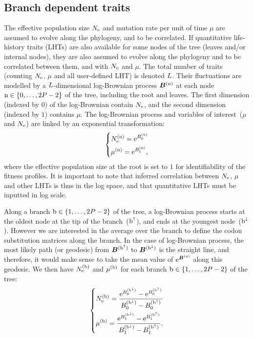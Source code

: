 \documentclass{MBE}
\begin{document}
	\subsection{Branch dependent traits}
	The {effective population size} $N_{\text{e}}$ and mutation rate per unit of time $\mu$ are assumed to evolve along the phylogeny, and to be correlated.
	If quantitative life-history traits ({LHT}s) are also available for some nodes of the tree (leaves and/or internal nodes), they are also assumed to evolve along the phylogeny and to be correlated between them, and with $N_{\text{e}}$ and $\mu$.
	The total number of traits (counting $N_{\text{e}}$, $\mu$ and all user-defined LHT) is denoted $L$.
	Their fluctuations are modelled by a $L$-dimensional log-Brownian process $\bm{B}^{(\text{n})}$ at each node $\text{n} \in \{0, \hdots, 2 P - 2\}$ of the tree, including the root and leaves.
	The first dimension (indexed by $0$) of the log-Brownian contain $N_{\text{e}}$, and the second dimension (indexed by $1$) contains $\mu$.
	The log-Brownian process and variables of interest~($\mu$ and $N_{\text{e}}$) are linked by an exponential transformation:
	\begin{equation}
		\begin{dcases}
			N_{\text{e}}^{(\text{n})} = \text{e}^{ B_{0}^{(\text{n})} } \\
			\mu^{(\text{n})} = \text{e}^{ B_{1}^{(\text{n})} },
		\end{dcases}
	\end{equation}
	where the {effective population size} at the root is set to $1$ for identifiability of the fitness profiles.
	It is important to note that inferred correlation between $N_{\text{e}}$, $\mu$ and other {LHT}s is thus in the log space, and that quantitative {LHT}s must be inputted in log scale.

	Along a branch $\text{b} \in \{1, \hdots, 2 P - 2\}$ of the tree, a log-Brownian process starts at the oldest node at the tip of the branch~($\text{b}^{\uparrow}$), and ends at the youngest node~($\text{b}^{\downarrow}$).
	However we are interested in the average over the branch to define the {codon} {substitution} matrices along the branch.
	In the case of log-Brownian process, the most likely path (or geodesic) from $\bm{B}^{(\text{b}^{\uparrow})}$ to $\bm{B}^{(\text{b}^{\downarrow})}$ is the straight line, and therefore, it would make sense to take the mean value of $\text{e}^{\bm{B}^{(\text{n})}}$ along this geodesic.
	We then have $N_{\text{e}}^{(\text{b})}$ and $\mu^{(\text{b})}$ for each branch $\text{b} \in \{1, \hdots, 2 P - 2\}$ of the tree:
	\begin{equation}
		\label{eq:branchNemu}
		\begin{dcases}
			\Ne\branchexp = \dfrac{\e^{\brownian_{0}^{(\nodeDown)}} - \e^{\brownian_{0}^{(\nodeUp)}}}{\brownian_{0}^{(\nodeDown)} - \brownian_{0}^{(\nodeUp)}} \\
			\mu\branchexp = \dfrac{\e^{\brownian_{1}^{(\nodeDown)}} - \e^{\brownian_{1}^{(\nodeUp)}}}{\brownian_{1}^{(\nodeDown)} - \brownian_{1}^{(\nodeUp)}}.
		\end{dcases}
	\end{equation}
\end{document}
